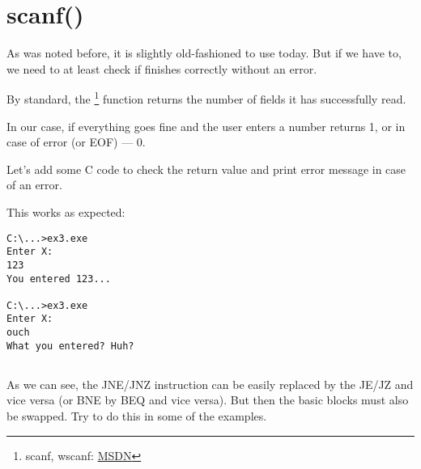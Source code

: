 \section{scanf()}

As was noted before, it is slightly old-fashioned to use \scanf today. 
But if we have to, we need to at least check if \scanf finishes correctly without an error.



By standard, the \scanf\footnote{scanf, wscanf: \href{http://go.yurichev.com/17255}{MSDN}} function returns the number of fields it has successfully read.

In our case, if everything goes fine and the user enters a number \scanf returns 1, or in case of error (or \ac{EOF}) --- 0.

Let's add some C code to check the \scanf return value and print error message in case of an error.

This works as expected:

\begin{lstlisting}
C:\...>ex3.exe
Enter X:
123
You entered 123...

C:\...>ex3.exe
Enter X:
ouch
What you entered? Huh?
\end{lstlisting}



\ifdefined\IncludeARM

\fi
\ifdefined\IncludeMIPS

\fi

\ifdefined\IncludeExercises
\subsection{\Exercise}

As we can see, the JNE/JNZ instruction can be easily replaced by the JE/JZ and vice versa 
(or BNE by BEQ and vice versa).
But then the basic blocks must also be swapped.
Try to do this in some of the examples.
\fi

